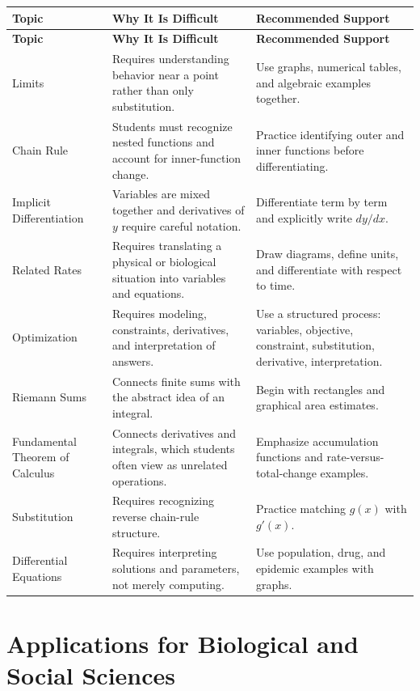 \documentclass[11pt]{article}
\begin{document}
\begin{longtable}{p{} p{} p{}}
\toprule
\textbf{Topic} & \textbf{Why It Is Difficult} & \textbf{Recommended Support} \\
\midrule
\endfirsthead

\toprule
\textbf{Topic} & \textbf{Why It Is Difficult} & \textbf{Recommended Support} \\
\midrule
\endhead

Limits & Requires understanding behavior near a point rather than only substitution. & Use graphs, numerical tables, and algebraic examples together. \\
Chain Rule & Students must recognize nested functions and account for inner-function change. & Practice identifying outer and inner functions before differentiating. \\
Implicit Differentiation & Variables are mixed together and derivatives of \(y\) require careful notation. & Differentiate term by term and explicitly write \(dy/dx\). \\
Related Rates & Requires translating a physical or biological situation into variables and equations. & Draw diagrams, define units, and differentiate with respect to time. \\
Optimization & Requires modeling, constraints, derivatives, and interpretation of answers. & Use a structured process: variables, objective, constraint, substitution, derivative, interpretation. \\
Riemann Sums & Connects finite sums with the abstract idea of an integral. & Begin with rectangles and graphical area estimates. \\
Fundamental Theorem of Calculus & Connects derivatives and integrals, which students often view as unrelated operations. & Emphasize accumulation functions and rate-versus-total-change examples. \\
Substitution & Requires recognizing reverse chain-rule structure. & Practice matching \(g(x)\) with \(g'(x)\). \\
Differential Equations & Requires interpreting solutions and parameters, not merely computing. & Use population, drug, and epidemic examples with graphs. \\
\bottomrule
\end{longtable}

\section{Applications for Biological and Social Sciences}
\end{document}
